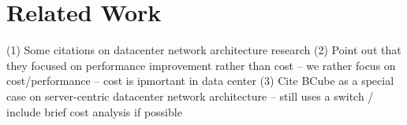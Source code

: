 \section{Related Work}
\label{sec:related}
(1) Some citations on datacenter network architecture research
(2) Point out that they focused on performance improvement rather than cost -- we rather focus on cost/performance -- cost is ipmortant in data center
(3) Cite BCube as a special case on server-centric datacenter network architecture  -- still uses a switch / include brief cost analysis if possible

